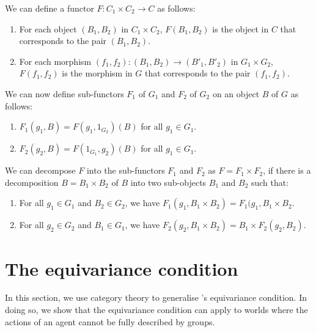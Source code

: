 \begin{definition}
    We can define a functor $F: C_{1} \times C_{2} \to C$ as follows:
    \begin{enumerate}
        \item For each object $(B_{1}, B_{2})$ in $C_{1} \times C_{2}$, $F(B_{1}, B_{2})$ is the object in $C$ that corresponds to the pair $(B_{1}, B_{2})$.
    
        \item For each morphism $(f_{1}, f_{2}): (B_{1}, B_{2}) \to (B'_{1}, B'_{2})$ in $G_{1} \times G_{2}$, $F(f_{1}, f_{2})$ is the morphism in $G$ that corresponds to the pair $(f_{1}, f_{2})$.
    \end{enumerate}
    
    We can now define sub-functors $F_{1}$ of $G_{1}$ and $F_{2}$ of $G_{2}$ on an object $B$ of $G$ as follows:
    \begin{enumerate}
        \item $F_{1}(g_{1}, B) = F(g_{1}, 1_{G_{2}})(B)$ for all $g_{1} \in G_{1}$.
        \item $F_{2}(g_{2}, B) = F(1_{G_{1}}, g_{2})(B)$ for all $g_{1} \in G_{1}$.
    \end{enumerate}
    
    We can decompose $F$ into the sub-functors $F_{1}$ and $F_{2}$ as $F = F_{1} \times F_{2}$, if there is a decomposition $B = B_{1} \times B_{2}$ of $B$ into two sub-objects $B_{1}$ and $B_{2}$ such that:
    \begin{enumerate}
        \item For all $g_{1} \in G_{1}$ and $B_{2} \in G_{2}$, we have $F_{1}(g_{1}, B_{1} \times B_{2}) = F_{1}(g_{1}, B_{1} \times B_{2}$.
    
        \item For all $g_{2} \in G_{2}$ and $B_{1} \in G_{1}$, we have $F_{2}(g_{2}, B_{1} \times B_{2}) = B_{1} \times F_{2}(g_{2}, B_{2})$.
    \end{enumerate}
\end{definition}


\section{The equivariance condition}

In this section, we use category theory to generalise \autocite{Higgins2018}'s equivariance condition.
In doing so, we show that the equivariance condition can apply to worlds where the actions of an agent cannot be fully described by groups.

